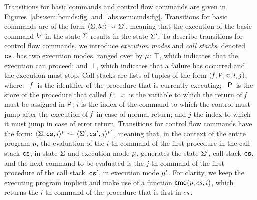 Transitions for basic commands and control flow commands are given 
in Figures~\ref{abs:sem:bcmds:fig} and~\ref{abs:sem:cmds:fig}. Transitions for 
basic commands are of the form 
$\langle \Sigma, bc \rangle \leadsto_{} \Sigma'$, meaning that the execution of the basic command 
$bc$ in the state $\Sigma$ results in the state $\Sigma'$. 
%
To describe transitions for control flow commands, we introduce \emph{execution modes} and 
\emph{call stacks}, denoted~$\mathtt{cs}$.  \jsil has two execution modes, ranged over by $\mu$: 
$\top$, which indicates that the execution can proceed; and~$\bot$, which indicates that a failure 
has occurred and the execution must stop. Call stacks are lists of tuples of the form $(\mathit{f}, {\sf P}, x, i, j)$, where: 
~$\mathit{f}$~is the identifier of the procedure that is currently executing;
~${\sf P}$~is the store of the procedure that called $\mathit{f}$; 
~$x$~is the variable to which the return of $\mathit{f}$ must be assigned in ${\sf P}$; 
 $i$ is the index of the command to which the control must jump after the execution of $\mathit{f}$ in case of normal return; 
and  $j$ the index to which it must jump in case of error return. 
Transitions for control flow commands have the form:  $\langle \Sigma, \mathtt{cs}, i \rangle^{\mu} \leadsto_{} \langle \Sigma', \mathtt{cs}', j \rangle^{\mu'}$, 
meaning that, in the context of the entire program $p$, the evaluation of the $i$-th command of the first procedure in the 
call stack $\mathtt{cs}$, in state $\Sigma$ and execution mode $\mu$, generates 
the state $\Sigma'$, call stack $\mathtt{cs}$,  and the next command to be evaluated is the $j$-th command of the first procedure 
of the call stack~$\mathtt{cs}'$, in execution mode $\mu'$. 
For clarity, we keep the executing program implicit and make use of a function $\ccmd{\prog, \cs, i}$, which 
returns the $i$-th command of the procedure that is first in $cs$. %



\newpage
